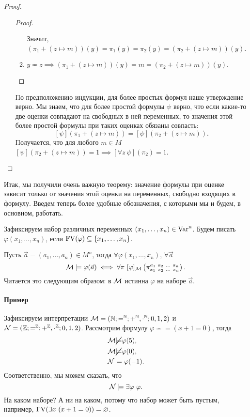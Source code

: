 \begin{proof}
\begin{enumerate}
\begin{proof}
\begin{enumerate}
                Значит, $(\pi_{1} + (z \mapsto m))(y) = \pi_{1}(y) = \pi_{2}(y) = (\pi_{2} + (z \mapsto m))(y)$.
                \item $y \eqcirc z \implies (\pi_{1} + (z \mapsto m))(y) = m = (\pi_{2} + (z \mapsto m))(y)$.
            \end{enumerate}
        \end{proof}
        По предположению индукции, для более простых формул наше утверждение верно.
        Мы знаем, что для более простой формулы $\psi$ верно, что если какие-то две оценки совпадают на свободных в ней переменных, то значения этой более простой формулы при таких оценках обязаны совпасть:
        $$
            [\psi](\pi_{1} + (z \mapsto m)) = [\psi](\pi_{2} + (z \mapsto m)).
        $$
        Получается, что для любого $m \in M$ $[\psi](\pi_{2} + (z \mapsto m)) = 1 \implies [\forall z~\psi](\pi_{2}) = 1$.
    \end{enumerate}
\end{proof}

Итак, мы получили очень важную теорему: значение формулы при оценке зависит только от значения этой оценки на переменных, свободно входящих в формулу.
Введем теперь более удобные обозначения, с которыми мы и будем, в основном, работать.

\begin{notation*}
    Зафиксируем набор различных переменных $(x_{1}, \ldots, x_{n}) \in \mathrm{Var}^{n}$.
    Будем писать $\varphi(x_{1}, \ldots, x_{n})$, если $\mathrm{FV}(\varphi) \subseteq \{x_{1}, \ldots, x_{n}\}$.
\end{notation*}

\begin{notation*}
    Пусть $\vec{a} = (a_{1}, \ldots, a_{n}) \in M^{n}$, тогда $\forall \varphi(x_{1}, \ldots, x_{n})$, $\forall \vec{a}$
    $$
        \mathcal{M} \models \varphi(\vec{a}) \iff \forall\pi~[\varphi]_{\mathcal{M}}\left(\pi_{x_{1}~x_{2}~\ldots~x_{n}}^{a_{1}~a_{2}~\ldots~a_{n}}\right).
    $$
    Читается это следующим образом: в $\mathcal{M}$ истинна $\varphi$ на наборе $\vec{a}$.
\end{notation*}

\paragraph{Пример}
Зафиксируем интерпретации $\mathcal{M} = (\mathbb{N}; =^{\mathbb{N}}; +^{\mathbb{N}}, \cdot^{\mathbb{N}}; 0, 1, 2)$ и $\mathcal{N} = (\mathbb{Z}; =^{\mathbb{Z}}; +^{\mathbb{Z}}, \cdot^{\mathbb{Z}}; 0, 1, 2)$.
Рассмотрим формулу $\varphi \eqcirc = (x + 1 = 0)$, тогда
\begin{align}
    &\mathcal{M} \cancel{\models} \varphi(5), \\
    &\mathcal{M} \cancel{\models} \varphi(0), \\
    &\mathcal{N} \models \varphi(-1).
\end{align}
Соответственно, мы можем сказать, что
$$
    \mathcal{N} \models \exists \varphi~\varphi.
$$
На каком наборе?
А ни на каком, потому что набор может быть пустым, например, $\mathrm{FV}(\exists x~ (x + 1 = 0)) = \varnothing$.

